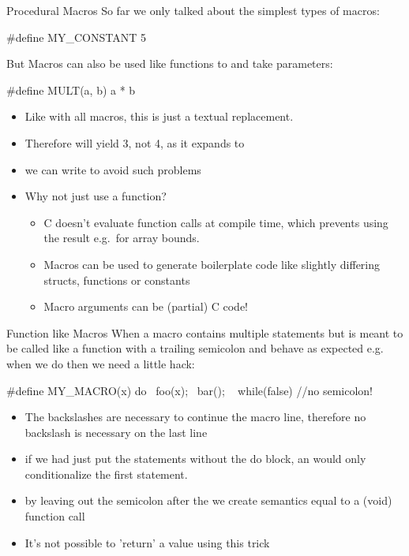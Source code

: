 \documentclass[10pt,graphics,aspectratio=169,table]{beamer}
\begin{document}
\begin{frame}[fragile]{Procedural Macros}
    So far we only talked about the simplest types of macros: 
    \begin{codeblock}
#define MY_CONSTANT 5
    \end{codeblock}

    But Macros can also be used like functions to and take parameters:
    \begin{codeblock}
#define MULT(a, b) a * b
    \end{codeblock}
    \begin{itemize}
        \item Like with all macros, this is just a textual replacement.
        \item Therefore  will yield 3,
         not 4, as it expands to 
        \item we can write 
         to avoid such problems
        \item Why not just use a function? 
        \begin{itemize}
            \item C doesn't evaluate function calls
            at compile time, which prevents using the result e.g.\ for array bounds. 
            \item Macros can be used to generate boilerplate code like
                slightly differing structs, functions or constants 
            \item Macro arguments can be (partial) C code!
        \end{itemize}
    \end{itemize}
\end{frame}

\begin{frame}[fragile]{Function like Macros}
    When a macro contains multiple statements but is meant to be called like
    a function with a trailing semicolon and behave as expected e.g.
    when we do  then we need a little hack: 
    \begin{codeblock}
#define MY_MACRO(x) do{             \
    foo(x);                         \
    bar();                          \
} while(false) //no semicolon! 
    \end{codeblock}

    \begin{itemize}
        \item The backslashes are necessary to continue the macro line,
            therefore no backslash is necessary on the last line
        \item if we had just put the statements without the do block, 
            an \code{if} would only conditionalize the first statement.
        \item by leaving out the semicolon after the  
            we create semantics equal to a (void) function call
        \item It's not possible to 'return' a value using this trick
    \end{itemize}
\end{frame}
\end{document}
